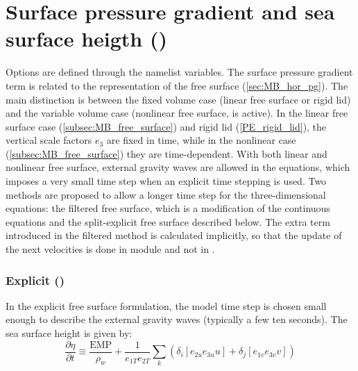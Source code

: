 \documentclass[../main/NEMO_manual]{subfiles}
\begin{document}
\section[Surface pressure gradient and sea surface heigth (\textit{dynspg.F90})]{Surface pressure gradient and sea surface heigth (\protect{})}
\label{sec:MBZ_dyn_hpg_spg}

Options are defined through the  namelist variables.
The surface pressure gradient term is related to the representation of the free surface (\autoref{sec:MB_hor_pg}).
The main distinction is between the fixed volume case (linear free surface or rigid lid) and
the variable volume case (nonlinear free surface,  is active).
In the linear free surface case (\autoref{subsec:MB_free_surface}) and rigid lid (\autoref{PE_rigid_lid}),
the vertical scale factors $e_{3}$ are fixed in time,
while in the nonlinear case (\autoref{subsec:MB_free_surface}) they are time-dependent.
With both linear and nonlinear free surface, external gravity waves are allowed in the equations,
which imposes a very small time step when an explicit time stepping is used.
Two methods are proposed to allow a longer time step for the three-dimensional equations:
the filtered free surface, which is a modification of the continuous equations %
and the split-explicit free surface described below.
The extra term introduced in the filtered method is calculated implicitly,
so that the update of the next velocities is done in module  and not in .

\subsubsection[Explicit (\texttt{\textbf{key\_dynspg\_exp}})]{Explicit (\protect{})}
\label{subsec:MBZ_dyn_spg_exp}

In the explicit free surface formulation, the model time step is chosen small enough to
describe the external gravity waves (typically a few ten seconds).
The sea surface height is given by:
\begin{equation}
  \label{eq:MBZ_dynspg_ssh}
  \frac{\partial \eta }{\partial t}\equiv \frac{\text{EMP}}{\rho_w }+\frac{1}{e_{1T}
    e_{2T} }\sum\limits_k {\left( {\delta_i \left[ {e_{2u} e_{3u} u}
        \right]+\delta_j \left[ {e_{1v} e_{3v} v} \right]} \right)}
\end{equation}
\end{document}

